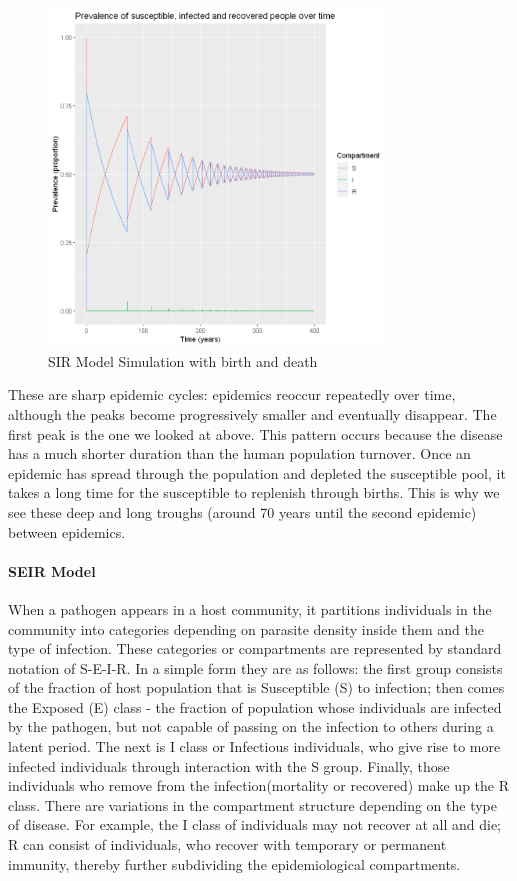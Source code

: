 \documentclass[a4paper, 12pt, twoside]{article}
\begin{document}
\begin{figure}[htpb]
	\centering
	\includegraphics[width=0.8\textwidth]{sir-model-birth-death}
	\caption{SIR Model Simulation with birth and death}
	\label{fig:sir-model-birth-death}
\end{figure}

These are sharp epidemic cycles: epidemics reoccur repeatedly over time, although the peaks become progressively smaller and eventually disappear.
The first peak is the one we looked at above.
This pattern occurs because the disease has a much shorter duration than the human population turnover.
Once an epidemic has spread through the population and depleted the susceptible pool, it takes a long time for the susceptible to replenish through births.
This is why we see these deep and long troughs (around 70 years until the second epidemic) between epidemics.

\paragraph{SEIR Model}
When a pathogen appears in a host community, it partitions individuals in the community into categories depending on parasite density inside them and the type of infection.
These categories or compartments are represented by standard notation of S-E-I-R.
In a simple form they are as follows: the first group consists of the fraction of host population that is Susceptible (S) to infection; then comes the Exposed (E) class - the fraction of population whose individuals are infected by the pathogen, but not capable of passing on the infection to others during a latent period.
The next is I class or Infectious individuals, who give rise to more infected individuals through interaction with the S group.
Finally, those individuals who remove from the infection(mortality or recovered) make up the R class.
There are variations in the compartment structure depending on the type of disease.
For example, the I class of individuals may not recover at all and die; R can consist of individuals, who recover with temporary or permanent immunity, thereby further subdividing the epidemiological compartments.
\end{document}
